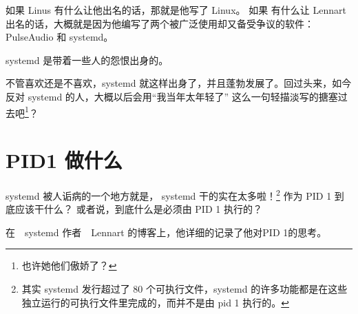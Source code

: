 
如果 Linus 有什么让他出名的话，那就是他写了 Linux。 如果 有什么让 Lennart 出名的话，大概就是因为他编写了两个被广泛使用却又备受争议的软件： PulseAudio 和 systemd。

systemd 是带着一些人的怨恨出身的。

不管喜欢还是不喜欢，systemd 就这样出身了，并且蓬勃发展了。回过头来，如今反对 systemd 的人，大概以后会用“我当年太年轻了” 这么一句轻描淡写的搪塞过去吧\footnote{也许她他们傲娇了？}？

\section{PID1 做什么}

systemd 被人诟病的一个地方就是， systemd 干的实在太多啦！\footnote{其实 systemd 发行超过了 80 个可执行文件，systemd 的许多功能都是在这些独立运行的可执行文件里完成的，而并不是由 pid 1 执行的。} 作为 PID 1 到底应该干什么？ 或者说，到底什么是必须由 PID 1 执行的？

在　systemd 作者　Lennart 的博客上，他详细的记录了他对PID 1的思考。

